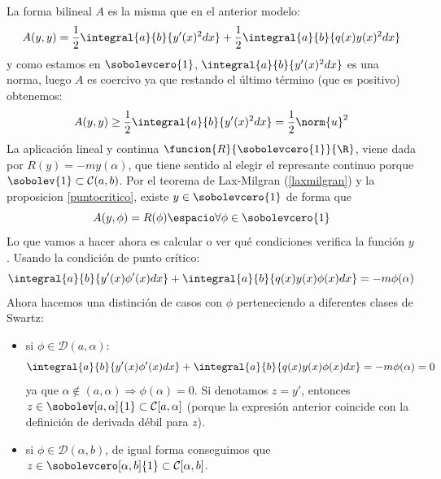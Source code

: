 \begin{center}
\end{center}
La forma bilineal $A$ es la misma que en el anterior modelo:
\[
A(y,y)=\frac{1}{2}\integral{a}{b}{y'(x)^2dx}+\frac{1}{2}\integral{a}{b}{q(x)y(x)^2dx}
\]
y como estamos en $\sobolevcero{1}$, $\integral{a}{b}{y'(x)^2dx}$ es una norma, luego $A$ es coercivo ya que restando el último término (que es positivo) obtenemos:
\[
A(y,y)\geq \frac{1}{2}\integral{a}{b}{y'(x)^2dx} = \frac{1}{2}\norm{u}^2
\] 
La aplicación lineal y continua $\funcion{R}{\sobolevcero{1}}{\R}$, viene dada por $R(y)=-my(\alpha)$, que tiene sentido al elegir el represante continuo porque $\sobolev{1}\subset \mathcal{C}(a,b)$. Por el teorema de Lax-Milgran (\ref{laxmilgran}) y la proposicion \ref{puntocritico}, existe $y\in\sobolevcero{1}$ de forma que
\[
A(y,\phi)=R(\phi) \espacio \forall \phi\in\sobolevcero{1}
\]
Lo que vamos a hacer ahora es calcular o ver qué condiciones verifica la función $y$. Usando la condición de punto crítico:
\begin{equation}
\label{formulageneral}
\integral{a}{b}{y'(x)\phi'(x)dx}+\integral{a}{b}{q(x)y(x)\phi(x)dx}=-m\phi(\alpha)
\end{equation}
Ahora hacemos una distinción de casos con $\phi$ perteneciendo a diferentes clases de Swartz:
\begin{itemize}[-]
\item si $\phi\in\mathcal{D}(a,\alpha)$:
\[
\integral{a}{b}{y'(x)\phi'(x)dx}+\integral{a}{b}{q(x)y(x)\phi(x)dx}=-m\phi(\alpha)=0
\]
ya que $\alpha\notin(a,\alpha) \Rightarrow \phi(\alpha)=0$. Si denotamos $z=y'$, entonces $z\in\sobolev[a,\alpha]{1}\subset\mathcal{C}[a,\alpha]$ (porque la expresión anterior coincide con la definición de derivada débil para $z$).
\item si $\phi\in\mathcal{D}(\alpha,b)$, de igual forma conseguimos que $z\in\sobolevcero[\alpha,b]{1}\subset\mathcal{C}[\alpha,b]$. 
\end{itemize}
